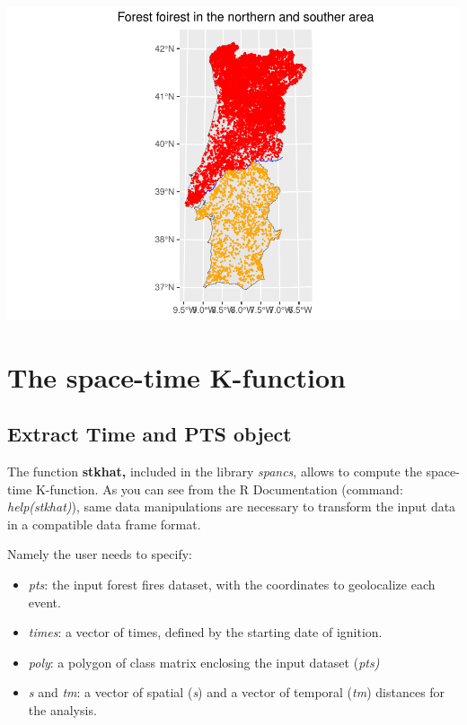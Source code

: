 \documentclass[
]{book}
\begin{document}
\includegraphics{03-KDE_files/figure-latex/import-NS-FF-1.pdf}

\hypertarget{the-space-time-k-function}{%
\section{The space-time K-function}\label{the-space-time-k-function}}

\hypertarget{extract-time-and-pts-object}{%
\subsection{Extract Time and PTS object}\label{extract-time-and-pts-object}}

The function \textbf{stkhat,} included in the library \emph{spancs}, allows to compute the space-time K-function.
As you can see from the R Documentation (command: \emph{help(stkhat)}), same data manipulations are necessary to transform the input data in a compatible data frame format.

Namely the user needs to specify:

\begin{itemize}
\item
  \emph{pts}: the input forest fires dataset, with the coordinates to geolocalize each event.
\item
  \emph{times}: a vector of times, defined by the starting date of ignition.
\item
  \emph{poly}: a polygon of class matrix enclosing the input dataset (\emph{pts)}
\item
  \emph{s} and \emph{tm}: a vector of spatial (\emph{s}) and a vector of temporal (\emph{tm}) distances for the analysis.
\end{itemize}
\end{document}
